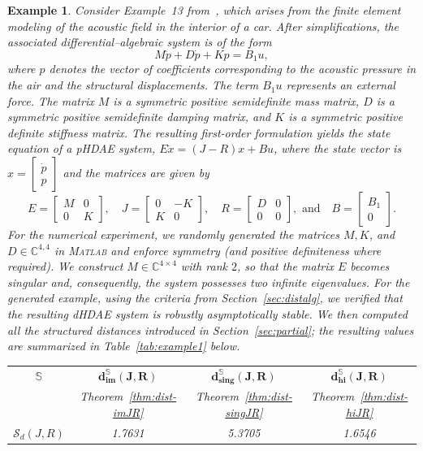 \documentclass[11pt]{article}
\newcommand {\mat}[1]{\left[\begin{array}{#1}}
\newcommand {\rix}{\end{array}\right]}
\newtheorem{example}[theorem]{Example}
\newcommand{\C}{\mathbb C}
\begin{document}
\begin{example}{\rm
    Consider Example~13 from~\cite{BeaMXZ18}, which arises from the finite element modeling of the acoustic field in the interior of a car. After simplifications, the associated differential–algebraic system is of the form
    \[
    M \ddot{p} + D \dot{p} + K p = B_1 u,
    \]
    where $p$ denotes the vector of coefficients corresponding to the acoustic pressure in the air and the structural displacements. The term $B_1 u$ represents an external force. The matrix $M$ is a symmetric positive semidefinite mass matrix, $D$ is a symmetric positive semidefinite damping matrix, and $K$ is a symmetric positive definite stiffness matrix. The resulting first-order formulation yields the state equation of a pHDAE system, $E \dot{x} = (J-R) x + B u$, where the state vector is $x = \mat{c}\dot{p}\\ p \rix $ and the matrices are given by
    \[
    E = \mat{cc} M & 0 \\ 0 & K \rix,
    \quad
    J = \mat{cc} 0 & -K \\ K & 0 \rix,
    \quad
    R = \mat{cc} D & 0 \\ 0 & 0 \rix, \text{ and}
    \quad
    B = \mat{c} B_1 \\ 0 \rix.
    \]
    For the numerical experiment, we randomly generated the matrices $M, K$, and $D\in \C^{4,4}$ in \textsc{Matlab} and enforce symmetry (and positive definiteness where required). We construct $M \in \mathbb{C}^{4\times 4} $ with rank $2$, so that the matrix $E$ becomes singular and, consequently, the system possesses two infinite eigenvalues. For the generated example,  using the criteria from Section~\ref{sec:distalg},  we verified that the resulting dHDAE system is robustly asymptotically stable. We then computed all the structured distances introduced in Section~\ref{sec:partial}; the resulting values are summarized in Table~\ref{tab:example1} below.
    \begin{table}[h!]
        \centering
        \renewcommand{\arraystretch}{1.5}
        \begin{tabular}{cccc}
            \hline
            \textbf{$\mathbb  S$}
            & $\mathbf{d_{im}^{\mathbb S}(J,R)}$
            & $\mathbf{d_{sing}^{\mathbb S}(J,R)}$
            & $\mathbf{d_{hi}^{\mathbb S}(J,R)}$ \\

            & Theorem~\ref{thm:dist-imJR}
            & Theorem~\ref{thm:dist-singJR}
            & Theorem~\ref{thm:dist-hiJR}\\
            \hline
            $\mathcal S_d(J,R)$
            & 1.7631
            & 5.3705
            & 1.6546         \\


\end{tabular}
\end{table}}
\end{example}
\end{document}
